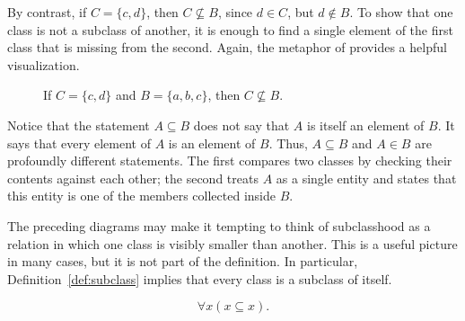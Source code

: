  By contrast, if \(C = \{c,d\}\), then \(C \nsubseteq B\), since \(d \in C\), but \(d \notin B\). To show that one class is not a subclass of another, it is enough to find a single element of the first class that is missing from the second. Again, the metaphor of  provides a helpful visualization.

\begin{sideillustration}[subclass2]
\begin{figure}[h]
\centering
{}
\caption{If \(C=\{c,d\}\) and \(B=\{a,b,c\}\), then \(C \nsubseteq B\).}
\end{figure}
\end{sideillustration}

 Notice that the statement \(A \subseteq B\) does not say that \(A\) is itself an element of \(B\). It says that every element of \(A\) is an element of \(B\). Thus, \(A \subseteq B\) and \(A \in B\) are profoundly different statements. The first compares two classes by checking their contents against each other; the second treats \(A\) as a single entity and states that this entity is one of the members collected inside \(B\).

 The preceding diagrams may make it tempting to think of subclasshood as a relation in which one class is visibly smaller than another. This is a useful picture in many cases, but it is not part of the definition. In particular, Definition~\ref{def:subclass} implies that every class is a subclass of itself. 

\begin{proposition}\label{prop:subclasshood-reflexive}
\[
\forall x(x\subseteq x).
\]
\end{proposition}

